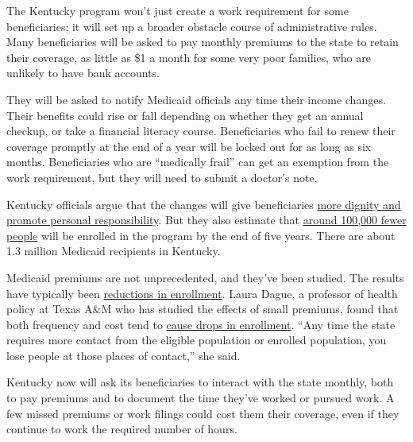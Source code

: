 The Kentucky program won't just create a work requirement for some
beneficiaries; it will set up a broader obstacle course of
administrative rules. Many beneficiaries will be asked to pay monthly
premiums to the state to retain their coverage, as little as \$1 a month
for some very poor families, who are unlikely to have bank accounts.

They will be asked to notify Medicaid officials any time their income
changes. Their benefits could rise or fall depending on whether they get
an annual checkup, or take a financial literacy course. Beneficiaries
who fail to renew their coverage promptly at the end of a year will be
locked out for as long as six months. Beneficiaries who are ``medically
frail'' can get an exemption from the work requirement, but they will
need to submit a doctor's note.

Kentucky officials argue that the changes will give beneficiaries
\href{https://www.nytimes3xbfgragh.onion/2018/01/12/health/kentucky-medicaid-work.html?rref=collection\%2Fbyline\%2Fabby-goodnough\&action=click\&contentCollection=undefined\&region=stream\&module=stream_unit\&version=latest\&contentPlacement=1\&pgtype=collection}{more
dignity and promote personal responsibility}. But they also estimate
that
\href{https://www.medicaid.gov/Medicaid-CHIP-Program-Information/By-Topics/Waivers/1115/downloads/ky/ky-health-pa2.pdf}{around
100,000 fewer people} will be enrolled in the program by the end of five
years. There are about 1.3 million Medicaid recipients in Kentucky.

Medicaid premiums are not unprecedented, and they've been studied. The
results have typically been
\href{https://www.kff.org/medicaid/issue-brief/the-effects-of-premiums-and-cost-sharing-on-low-income-populations-updated-review-of-research-findings/}{reductions
in enrollment}. Laura Dague, a professor of health policy at Texas A\&M
who has studied the effects of small premiums, found that both frequency
and cost tend to
\href{https://ccf.georgetown.edu/wp-content/uploads/2012/03/Dague-Premiums.pdf}{cause
drops in enrollment}. ``Any time the state requires more contact from
the eligible population or enrolled population, you lose people at those
places of contact,'' she said.

Kentucky now will ask its beneficiaries to interact with the state
monthly, both to pay premiums and to document the time they've worked or
pursued work. A few missed premiums or work filings could cost them
their coverage, even if they continue to work the required number of
hours.


